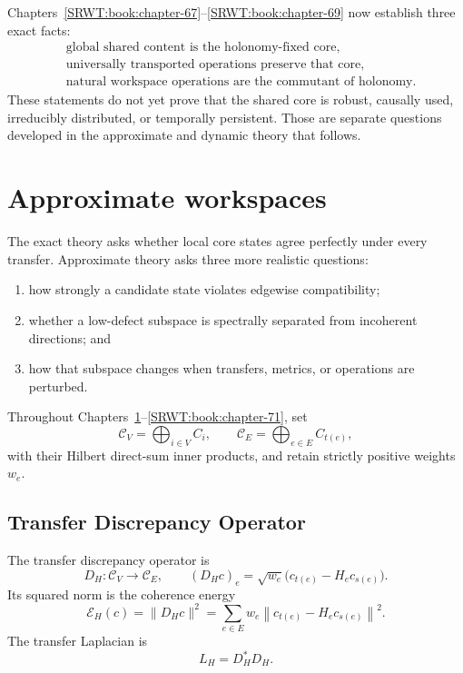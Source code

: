 
Chapters~\ref{SRWT:book:chapter-67}--\ref{SRWT:book:chapter-69} now establish three exact facts:
\[
\begin{aligned}
&\text{global shared content is the holonomy-fixed core},\\
&\text{universally transported operations preserve that core},\\
&\text{natural workspace operations are the commutant of holonomy}.
\end{aligned}
\]
These statements do not yet prove that the shared core is robust, causally
used, irreducibly distributed, or temporally persistent. Those are separate
questions developed in the approximate and dynamic theory that follows.


\chapter{Approximate workspaces}\label{SRWT:book:chapter-70}


The exact theory asks whether local core states agree perfectly under every
transfer. Approximate theory asks three more realistic questions:
\begin{enumerate}
\item how strongly a candidate state violates edgewise compatibility;
\item whether a low-defect subspace is spectrally separated from incoherent
 directions; and
\item how that subspace changes when transfers, metrics, or operations are
 perturbed.
\end{enumerate}
Throughout Chapters~\ref{SRWT:book:chapter-70}--\ref{SRWT:book:chapter-71}, set
\[
\mathcal C_V=\bigoplus_{i\in V}C_i,
\qquad
\mathcal C_E=\bigoplus_{e\in E}C_{t(e)},
\]
with their Hilbert direct-sum inner products, and retain strictly positive
weights \(w_e\).

\section{Transfer Discrepancy Operator}

\begin{SRWTdefinition}\label{SRWT:def:transfer-discrepancy}
The transfer discrepancy operator is
\[
D_H:\mathcal C_V\longrightarrow\mathcal C_E,
\qquad
(D_Hc)_e
=
\sqrt{w_e}\bigl(c_{t(e)}-H_ec_{s(e)}\bigr).
\]
Its squared norm is the coherence energy
\[
\boxed{
\mathcal E_H(c)
=
\|D_Hc\|^2
=
\sum_{e\in E}w_e
\left\|c_{t(e)}-H_ec_{s(e)}\right\|^2.
}
\]
The transfer Laplacian is
\[
\boxed{L_H=D_H^*D_H.}
\]
\end{SRWTdefinition}

